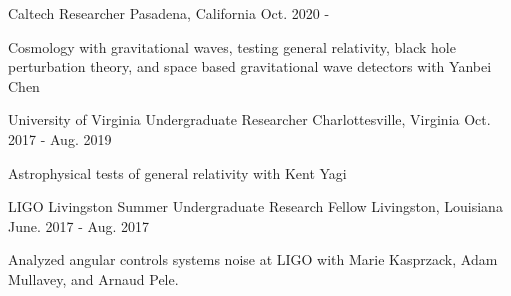 

\begin{cventries}

  \cventry
    {Caltech } %
    {Researcher} %
    {Pasadena, California} %
    {Oct. 2020 - } %
    {
      \begin{cvitems} %
        \item {Cosmology with gravitational waves, testing general relativity, black hole perturbation theory, and space based gravitational wave detectors with Yanbei Chen}
      \end{cvitems}
    }

  \cventry
    {University of Virginia} %
    {Undergraduate Researcher} %
    {Charlottesville, Virginia} %
    {Oct. 2017 - Aug. 2019} %
    {
      \begin{cvitems} %
        \item {Astrophysical tests of general relativity with Kent Yagi}
      \end{cvitems}
    }

  \cventry
    {LIGO Livingston} %
    {Summer Undergraduate Research Fellow} %
    {Livingston, Louisiana} %
    {June. 2017 - Aug. 2017 } %
    {
      \begin{cvitems} %
        \item {Analyzed angular controls systems noise at LIGO with Marie Kasprzack, Adam Mullavey, and Arnaud Pele.}
      \end{cvitems}
    }


\end{cventries}

